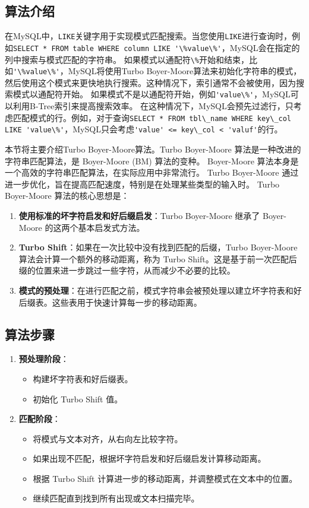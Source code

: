 \documentclass{report}
\begin{document}
\subsection{算法介绍}
在MySQL中，\verb|LIKE|关键字用于实现模式匹配搜索。当您使用\verb|LIKE|进行查询时，例如\verb|SELECT * FROM table WHERE column LIKE '\%value\%'|，MySQL会在指定的列中搜索与模式匹配的字符串。
如果模式以通配符\verb|\%|开始和结束，比如\verb|'\%value\%'|，MySQL将使用Turbo Boyer-Moore算法来初始化字符串的模式，然后使用这个模式来更快地执行搜索。这种情况下，索引通常不会被使用，因为搜索模式以通配符开始。
如果模式不是以通配符开始，例如\verb|'value\%'|，MySQL可以利用B-Tree索引来提高搜索效率。
在这种情况下，MySQL会预先过滤行，只考虑匹配模式的行。例如，对于查询\verb|SELECT * FROM tbl\_name WHERE key\_col LIKE 'value\%'|，MySQL只会考虑\verb|'value' <= key\_col < 'valuf'|的行。
\par
本节将主要介绍Turbo Boyer-Moore算法。Turbo Boyer-Moore 算法是一种改进的字符串匹配算法，是 Boyer-Moore (BM) 算法的变种。
Boyer-Moore 算法本身是一个高效的字符串匹配算法，在实际应用中非常流行。
Turbo Boyer-Moore 通过进一步优化，旨在提高匹配速度，特别是在处理某些类型的输入时。
Turbo Boyer-Moore 算法的核心思想是：
\begin{enumerate}
    \item \textbf{使用标准的坏字符启发和好后缀启发}：Turbo Boyer-Moore 继承了 Boyer-Moore 的这两个基本启发式方法。
    \item \textbf{Turbo Shift}：如果在一次比较中没有找到匹配的后缀，Turbo Boyer-Moore 算法会计算一个额外的移动距离，称为 Turbo Shift。这是基于前一次匹配后缀的位置来进一步跳过一些字符，从而减少不必要的比较。
    \item \textbf{模式的预处理}：在进行匹配之前，模式字符串会被预处理以建立坏字符表和好后缀表。这些表用于快速计算每一步的移动距离。
\end{enumerate}

\subsection{算法步骤}

\begin{enumerate}
    \item \textbf{预处理阶段}：
    \begin{itemize}
        \item 构建坏字符表和好后缀表。
        \item 初始化 Turbo Shift 值。
    \end{itemize}
    \item \textbf{匹配阶段}：
    \begin{itemize}
        \item 将模式与文本对齐，从右向左比较字符。
        \item 如果出现不匹配，根据坏字符启发和好后缀启发计算移动距离。
        \item 根据 Turbo Shift 计算进一步的移动距离，并调整模式在文本中的位置。
        \item 继续匹配直到找到所有出现或文本扫描完毕。
    \end{itemize}
\end{enumerate}
\end{document}
